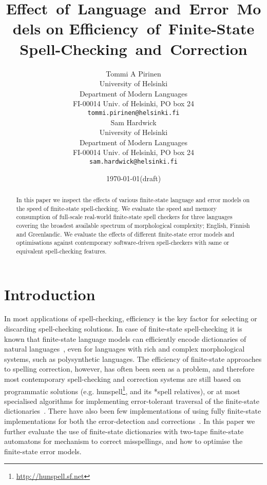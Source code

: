 \documentclass[11pt]{article}
\title{Effect~of~Language~and~Error~Models on Efficiency~of~Finite-State
Spell-Checking~and~Correction}
\author{
Tommi A Pirinen\\
University of Helsinki\\
Department of Modern Languages\\
FI-00014 Univ. of Helsinki, PO box 24\\
{\tt tommi.pirinen@helsinki.fi} \\\And
Sam Hardwick\\
University of Helsinki\\
Department of Modern Languages\\
FI-00014 Univ. of Helsinki, PO box 24\\
{\tt sam.hardwick@helsinki.fi} \\
}
\date{\today (draft)}
\begin{document}
\maketitle
\begin{abstract}
In this paper we inspect the effects of various finite-state language and
error models on the speed of finite-state spell-checking. We evaluate the speed and
memory consumption of full-scale real-world finite-state spell checkers for
three languages covering the broadest available spectrum of morphological
complexity; English, Finnish and Greenlandic. We evaluate the effects of
different finite-state error models and optimisations against contemporary
software-driven spell-checkers with same or equivalent spell-checking features.
\end{abstract}

\section{Introduction}
\label{sec:introduction}

In most applications of spell-checking, efficiency is the key factor for
selecting or discarding spell-checking solutions. In case of finite-state
spell-checking it is known that finite-state language
models can efficiently encode dictionaries of natural
languages~\cite{beesley/2003}, even for languages with rich and complex
morphological systems, such as polysynthetic languages. The efficiency of
finite-state approaches to spelling correction, however, has often been seen as
a problem, and therefore most contemporary spell-checking and correction
systems are still based on programmatic solutions (e.g.
hunspell\footnote{\url{http://hunspell.sf.net}}, and its *spell relatives), or
at most specialised algorithms for implementing error-tolerant traversal of the
finite-state dictionaries~\cite{oflazer/1996,hulden/2009}. There have also been
few implementations of using fully finite-state implementations for both the
error-detection and corrections~\cite{schulz/2002,pirinen/2010/lrec}. In this
paper we further evaluate the use of finite-state dictionaries with two-tape
finite-state automatons for mechanism to correct misspellings, and how to
optimise the finite-state error models.
\end{document}

